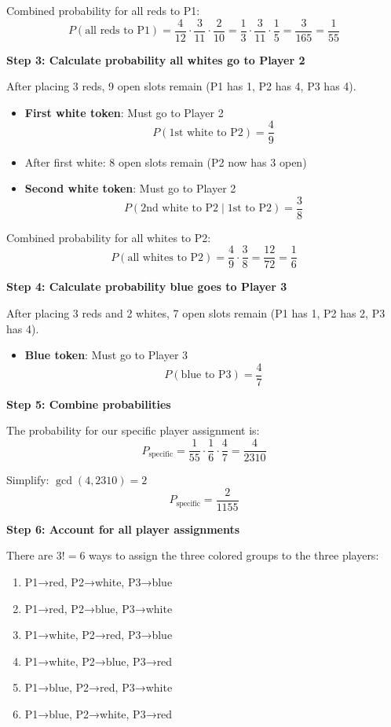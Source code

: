 \documentclass[12pt]{article}
\begin{document}
Combined probability for all reds to P1:
\[P(\text{all reds to P1}) = \frac{4}{12} \cdot \frac{3}{11} \cdot \frac{2}{10} = \frac{1}{3} \cdot \frac{3}{11} \cdot \frac{1}{5} = \frac{3}{165} = \frac{1}{55}\]

\textbf{Step 3: Calculate probability all whites go to Player 2}

After placing 3 reds, 9 open slots remain (P1 has 1, P2 has 4, P3 has 4).

\begin{itemize}
    \item \textbf{First white token}: Must go to Player 2
    \[P(\text{1st white to P2}) = \frac{4}{9}\]
    
    \item After first white: 8 open slots remain (P2 now has 3 open)
    
    \item \textbf{Second white token}: Must go to Player 2
    \[P(\text{2nd white to P2} \mid \text{1st to P2}) = \frac{3}{8}\]
\end{itemize}

Combined probability for all whites to P2:
\[P(\text{all whites to P2}) = \frac{4}{9} \cdot \frac{3}{8} = \frac{12}{72} = \frac{1}{6}\]

\textbf{Step 4: Calculate probability blue goes to Player 3}

After placing 3 reds and 2 whites, 7 open slots remain (P1 has 1, P2 has 2, P3 has 4).

\begin{itemize}
    \item \textbf{Blue token}: Must go to Player 3
    \[P(\text{blue to P3}) = \frac{4}{7}\]
\end{itemize}

\textbf{Step 5: Combine probabilities}

The probability for our specific player assignment is:
\[P_{\text{specific}} = \frac{1}{55} \cdot \frac{1}{6} \cdot \frac{4}{7} = \frac{4}{2310}\]

Simplify: $\gcd(4, 2310) = 2$
\[P_{\text{specific}} = \frac{2}{1155}\]

\textbf{Step 6: Account for all player assignments}

There are $3!  = 6$ ways to assign the three colored groups to the three players:
\begin{enumerate}
    \item P1→red, P2→white, P3→blue
    \item P1→red, P2→blue, P3→white
    \item P1→white, P2→red, P3→blue
    \item P1→white, P2→blue, P3→red
    \item P1→blue, P2→red, P3→white
    \item P1→blue, P2→white, P3→red
\end{enumerate}
\end{document}

